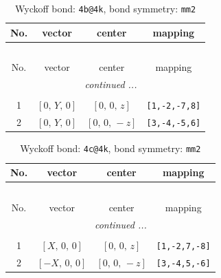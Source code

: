 \documentclass[fleqn,8pt]{jsarticle}
\begin{document}
\renewcommand{\arraystretch}{1.2}
\begin{longtable}{cccc}
\caption{Wyckoff bond: {\tt 4b@4k}, bond symmetry: {\tt mm2}}
 \\
 \hline \hline
No. & vector & center & mapping \\ \hline \endfirsthead

\multicolumn{3}{l}{\tablename\ \thetable{}} \\
 \hline \hline
No. & vector & center & mapping \\ \hline \endhead

 \hline \hline
\multicolumn{3}{r}{\footnotesize\it continued ...} \\ \endfoot

 \hline \hline
\multicolumn{3}{r}{} \\ \endlastfoot

1 & $\left[ 0,\, Y,\, 0 \right]$ & $\left[ 0,\, 0,\, z \right]$ & {\tt [1,-2,-7,8]} \\ \hline
2 & $\left[ 0,\, Y,\, 0 \right]$ & $\left[ 0,\, 0,\, - z \right]$ & {\tt [3,-4,-5,6]} \\
\end{longtable}
\renewcommand{\arraystretch}{1.2}
\begin{longtable}{cccc}
\caption{Wyckoff bond: {\tt 4c@4k}, bond symmetry: {\tt mm2}}
 \\
 \hline \hline
No. & vector & center & mapping \\ \hline \endfirsthead

\multicolumn{3}{l}{\tablename\ \thetable{}} \\
 \hline \hline
No. & vector & center & mapping \\ \hline \endhead

 \hline \hline
\multicolumn{3}{r}{\footnotesize\it continued ...} \\ \endfoot

 \hline \hline
\multicolumn{3}{r}{} \\ \endlastfoot

1 & $\left[ X,\, 0,\, 0 \right]$ & $\left[ 0,\, 0,\, z \right]$ & {\tt [1,-2,7,-8]} \\ \hline
2 & $\left[ - X,\, 0,\, 0 \right]$ & $\left[ 0,\, 0,\, - z \right]$ & {\tt [3,-4,5,-6]} \\
\end{longtable}
\renewcommand{\arraystretch}{1.2}
\end{document}

